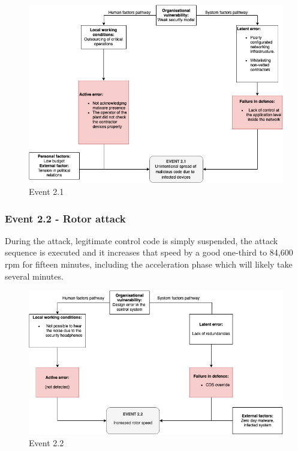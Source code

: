 \documentclass[12pt]{article}
\begin{document}
        \begin{figure}[H]
        \centering
        \includegraphics[width=\textwidth]{event21.png}
        \caption{Event 2.1}
        \label{fig:event21}
        \end{figure}
        
    \subsubsection{Event 2.2 - Rotor attack}
    During the attack, legitimate control code is simply suspended, the attack sequence is executed and it increases that speed by a good one-third to 84,600 rpm for fifteen minutes, including the acceleration phase which will likely take several minutes.
    
        \begin{figure}[H]
        \centering
        \includegraphics[width=\textwidth]{event22.png}
        \caption{Event 2.2}
        \label{fig:event22}
        \end{figure}
        
\end{document}
